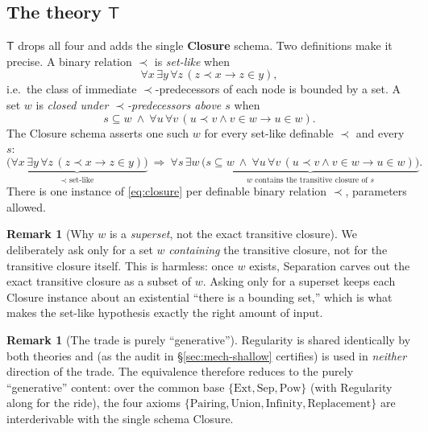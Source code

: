 \documentclass[11pt]{article}
\theoremstyle{plain}
\theoremstyle{definition}
\newtheorem{remark}[theorem]{Remark}
\newcommand{\T}{\textsf{T}}
\begin{document}
\subsection{The theory $\T$}

$\T$ drops all four and adds the single \textbf{Closure} schema. Two definitions
make it precise. A binary relation $\prec$ is \emph{set-like} when
\begin{equation}\label{eq:setlike}
  \forall x\,\exists y\,\forall z\,(z \prec x \to z \in y),
\end{equation}
i.e.\ the class of immediate $\prec$-predecessors of each node is bounded by a set.
A set $w$ is \emph{closed under $\prec$-predecessors above $s$} when
\begin{equation}\label{eq:closed}
  s \subseteq w \ \wedge\ \forall u\,\forall v\,(u \prec v \wedge v \in w \to u \in w).
\end{equation}
The Closure schema asserts one such $w$ for every set-like definable $\prec$ and
every $s$:
\begin{equation}\label{eq:closure}
  \underbrace{\bigl(\forall x\,\exists y\,\forall z\,(z\prec x \to z\in y)\bigr)}_{\text{$\prec$ set-like}}
  \ \Longrightarrow\
  \forall s\,\exists w\,\underbrace{\bigl(s\subseteq w \ \wedge\ \forall u\,\forall v\,(u\prec v \wedge v\in w \to u\in w)\bigr)}_{\text{$w$ contains the transitive closure of $s$}}.
\end{equation}
There is one instance of \eqref{eq:closure} per definable binary relation $\prec$,
parameters allowed.

\begin{remark}[Why $w$ is a \emph{superset}, not the exact transitive closure]
We deliberately ask only for a set $w$ \emph{containing} the transitive closure,
not for the transitive closure itself. This is harmless: once $w$ exists,
Separation carves out the exact transitive closure as a subset of $w$. Asking only
for a superset keeps each Closure instance about an existential ``there is a
bounding set,'' which is what makes the set-like hypothesis exactly the right
amount of input.
\end{remark}

\begin{remark}[The trade is purely ``generative'']
Regularity is shared identically by both theories and (as the audit in
\S\ref{sec:mech-shallow} certifies) is used in \emph{neither} direction of the trade.
The equivalence therefore reduces to the purely ``generative'' content: over the
common base $\{\text{Ext},\text{Sep},\text{Pow}\}$ (with Regularity along for the
ride),
the four axioms $\{\text{Pairing},\text{Union},\text{Infinity},\text{Replacement}\}$
are interderivable with the single schema Closure.
\end{remark}
\end{document}
